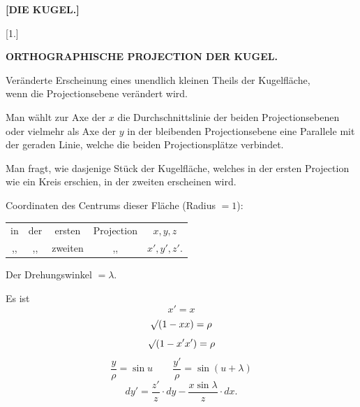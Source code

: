 \clearpage{}

\begin{center}
\large\bfseries [DIE KUGEL.]
\end{center}

\begin{center}
[1.]
\end{center}

\begin{center}
\bfseries ORTHOGRAPHISCHE PROJECTION DER KUGEL.
\end{center}

\begin{center}
Veränderte Erscheinung eines unendlich kleinen Theils der Kugelfläche,\\
wenn die Projectionsebene verändert wird.
\end{center}

Man wählt zur Axe der $x$ die Durchschnittslinie der beiden Projectionsebenen oder vielmehr als Axe der $y$ in der bleibenden Projectionsebene eine Parallele mit der geraden Linie, welche die beiden Projectionsplätze verbindet.

Man fragt, wie dasjenige Stück der Kugelfläche, welches in der ersten Projection wie ein Kreis erschien, in der zweiten erscheinen wird.

Coordinaten des Centrums dieser Fläche (Radius $= 1$):

\begin{center}
\begin{tabular}{ccccc}
in & der & ersten & Projection & $x,y,z$\\
,, & ,, & zweiten & ,, & $x',y',z'$.
\end{tabular}
\end{center}

Der Drehungswinkel $= \lambda$.

Es ist
\[
x' = x
\]
\[
\mathord{\surd}(1-xx) = \rho
\]
\[
\mathord{\surd}(1-x'x') = \rho
\]
\[
\frac{y}{\rho} = \sin u \qquad \frac{y'}{\rho} = \sin(u+\lambda)
\]
\[
dy' = \frac{z'}{z}\cdot dy - \frac{x\sin\lambda}{z}\cdot dx.
\]
